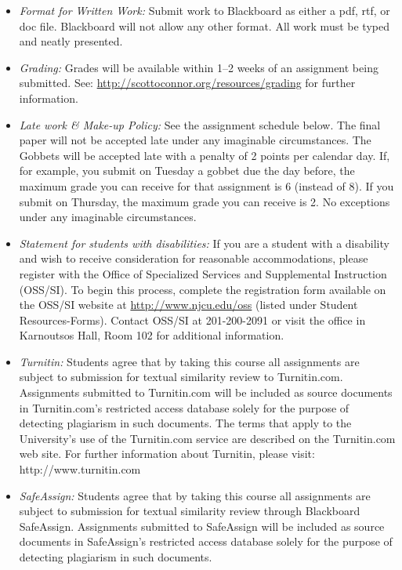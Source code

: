 \documentclass[article,oneside]{memoir}
\begin{document}
\begin{itemize}
\item \textit{Format for Written Work:} Submit work to Blackboard as either a pdf, rtf, or doc file. Blackboard will not allow any other format. All work must be typed and neatly presented. 


\item \textit{Grading:} Grades will be available within 1--2 weeks of an assignment being submitted. See: \href{http://scottoconnor.org/resources/grading}{http://scottoconnor.org/resources/grading} for further information.


\item \textit{Late work \& Make-up Policy:} See the assignment schedule below. The final paper will not be accepted late under any imaginable circumstances. The Gobbets will be accepted late with a penalty of 2 points per calendar day. If, for example, you submit on Tuesday a gobbet due the day before, the maximum grade you can receive for that assignment is 6 (instead of 8). If you submit on Thursday, the maximum grade you can receive is 2. No exceptions under any imaginable circumstances.

\item \textit{Statement for students with disabilities:} If you are a student
with a disability and wish to receive consideration for reasonable
accommodations, please register with the Office of Specialized Services
and Supplemental Instruction (OSS/SI). To begin this process, complete
the registration form available on the OSS/SI website at
\href{http://www.njcu.edu/oss}{http://www.njcu.edu/oss}
(listed under Student Resources-Forms). Contact OSS/SI at 201-200-2091
or visit the office in Karnoutsos Hall, Room 102 for additional
information.

\item \textit{Turnitin:} Students agree that by taking this course all assignments are subject to submission for textual similarity review to Turnitin.com. Assignments submitted to Turnitin.com will be included as source documents in Turnitin.com's restricted access database solely for the purpose of detecting plagiarism in such documents.  The terms that apply to the University’s use of the Turnitin.com service are described on the Turnitin.com web site.  For further information about Turnitin, please visit: http://www.turnitin.com 

\item \textit{SafeAssign:} Students agree that by taking this course all assignments are subject to submission for textual similarity review through Blackboard SafeAssign. Assignments submitted to SafeAssign will be included as source documents in SafeAssign's restricted access database solely for the purpose of detecting plagiarism in such documents.  


\end{itemize}
\end{document}
